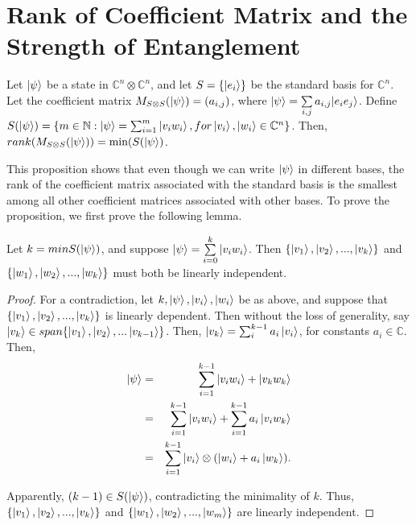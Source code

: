 \section{Rank of Coefficient Matrix and the Strength of Entanglement}
\begin{prop}
\label{rank prop}
Let $\ket{\psi}$ be a state in $\mathbb{C}^n \otimes \mathbb{C}^n$, and let $S=\{\ket{e_i}\}$ be the standard basis for $\mathbb{C}^n$. Let the coefficient matrix $M_{S \otimes S}(\ket{\psi})=(a_{i,j})$, where $\ket{\psi}=\sum\limits_{i,j}a_{i,j}|e_i e_j\rangle$.  Define $S(\ket{\psi})=\{m\in \mathbb{N}: \ket{\psi}=\sum_{i=1}^m\ket{v_i w_i}, for \ket{v_i}, \ket{w_i} \in \mathbb{C}^n\}$.  Then, $rank(M_{S \otimes S}(\ket{\psi}))=\textrm{min} (S(\ket{\psi})$.
\end{prop}
This proposition shows that even though we can write $\ket{\psi}$ in different bases, the rank of the coefficient matrix associated with the standard basis is the smallest among all other coefficient matrices associated with other bases. To prove the proposition, we first prove the following lemma.

\begin{lemma}
\label{independence lemma}
Let $k=min S(\ket{\psi})$, and suppose $\ket{\psi}=\sum\limits_{i=0}^k \ket{v_iw_i}$.  Then $\{\ket{v_1}, \ket{v_2},...,\ket{v_k}\}$ and $\{\ket{w_1}, \ket{w_2},...,\ket{w_k}\}$ must both be linearly independent.
\end{lemma}

\begin{proof}
For a contradiction, let $k, \ket{\psi}, \ket{v_i}, \ket{w_i}$ be as above, and suppose that $\{\ket{v_1}, \ket{v_2},...,\ket{v_k}\}$ is linearly dependent. Then without the loss of generality, say $\ket{v_k} \in span\{\ket{v_1}, \ket{v_2},...\ket{v_{k-1}}\}$. Then, $\ket{v_k}=\sum_i^{k-1} a_i \ket{v_i}$, for constants $a_i \in \mathbb{C}$.  Then, 
\begin{eqnarray*}
\ket{\psi}&=&\sum_{i=1}^{k-1} \ket{v_i w_i} + \ket{v_k w_k}\\
&=&\sum_{i=1}^{k-1} \ket{v_i w_i} + \sum_{i=1}^{k-1} a_i\ket{v_iw_k}\\
&=&\sum_{i=1}^{k-1} \ket{v_i} \otimes (\ket{w_i}+a_i\ket{w_k}).\\
\end{eqnarray*}

Apparently, $(k-1) \in S(\ket{\psi})$, contradicting the minimality of $k$.  Thus, $\{\ket{v_1}, \ket{v_2},...,\ket{v_k}\}$ and $\{\ket{w_1}, \ket{w_2},...,\ket{w_m}\}$ are linearly independent.
\end{proof}

